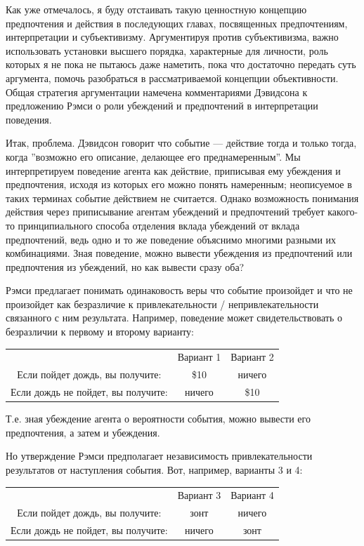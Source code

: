 \documentclass[11pt]{book}
\begin{document}
Как уже отмечалось, я буду отстаивать такую ценностную концепцию предпочтения и действия в последующих главах, посвященных предпочтениям, интерпретации и субъективизму. Аргументируя против субъективизма, важно использовать установки высшего порядка, характерные для личности, роль которых я не пока не пытаюсь даже наметить, пока что достаточно передать суть аргумента, помочь разобраться в рассматриваемой концепции объективности. Общая стратегия аргументации намечена комментариями Дэвидсона к предложению Рэмси о роли убеждений и предпочтений в интерпретации поведения.

Итак, проблема. Дэвидсон говорит что событие --- действие тогда и только тогда, когда ''возможно его описание, делающее его преднамеренным''. Мы интерпретируем поведение агента как действие, приписывая ему убеждения и предпочтения, исходя из которых его можно понять намеренным; неописуемое в таких терминах событие действием не считается. Однако возможность понимания действия через приписывание агентам убеждений и предпочтений требует какого-то принципиального способа отделения вклада убеждений от вклада предпочтений, ведь одно и то же поведение объяснимо многими разными их комбинациями. Зная поведение, можно вывести убеждения из предпочтений или предпочтения из убеждений, но как вывести сразу оба?

Рэмси предлагает понимать одинаковость веры что событие произойдет и что не произойдет как безразличие к привлекательности / непривлекательности связанного с ним результата. Например, поведение может свидетельствовать о безразличии к первому и второму варианту:

\begin{center}
  \begin{tabular}{ c c c }
    & Вариант 1 & Вариант 2 \\
    Если пойдет дождь, вы получите: & \$10 & ничего \\
    Если дождь не пойдет, вы получите: & ничего & \$10
  \end{tabular}
\end{center}

Т.е. зная убеждение агента о вероятности события, можно вывести его предпочтения, а затем и убеждения.

Но утверждение Рэмси предполагает независимость привлекательности результатов от наступления события. Вот, например, варианты 3 и 4:

\begin{center}
  \begin{tabular}{ c c c }
    & Вариант 3 & Вариант 4 \\
    Если пойдет дождь, вы получите: & зонт & ничего \\
    Если дождь не пойдет, вы получите: & ничего & зонт
  \end{tabular}
\end{center}
\end{document}
